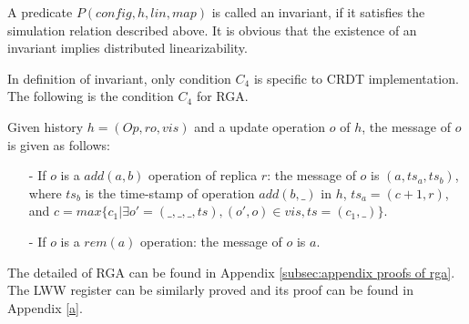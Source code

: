 {A predicate $P(\mathit{config},h,\mathit{lin},\mathit{map})$ is called an invariant, if it satisfies the simulation relation described above. It is obvious that the existence of an invariant implies distributed linearizability.




In definition of invariant, only condition $C_4$ is specific to CRDT implementation. The following is the condition $C_4$ for RGA.

\begin{example}
\label{example:c4 for rga}
Given history $h = (\mathit{Op},\mathit{ro},\mathit{vis})$ and a update operation $o$ of $h$, the message of $o$ is given as follows:

\begin{itemize}
\setlength{\itemsep}{0.5pt}
\item[-] If $o$ is a $\mathit{add}(a,b)$ operation of replica $r$: the message of $o$ is $(a,\mathit{ts}_a,\mathit{ts}_b)$, where $\mathit{ts}_b$ is the time-stamp of operation $\mathit{add}(b,\_)$ in $h$, $\mathit{ts}_a = (c+1, r)$, and $c = \mathit{max}\{ c_1 \vert \exists o' = (\_,\_,\_,\mathit{ts}), (o',o) \in \mathit{vis}, \mathit{ts} = (c_1,\_) \}$.

\item[-] If $o$ is a $\mathit{rem}(a)$ operation: the message of $o$ is $a$.
\end{itemize}
\end{example}

The detailed of RGA can be found in Appendix \ref{subsec:appendix proofs of rga}. The LWW register can be similarly proved and its proof can be found in Appendix \ref{a}.
}







